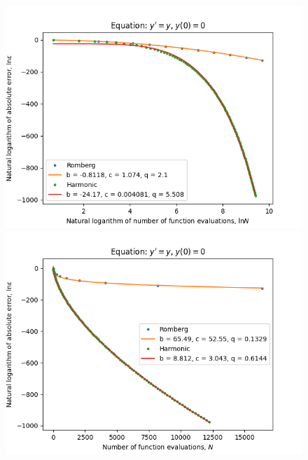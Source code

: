\begin{figure}[H]
\centering
\begin{minipage}{0.45\textwidth}
\centering
\includegraphics[scale=0.45]{emr_plots/exp_growth_hp_log_log_pow_fit_trend.png}
\end{minipage}
\begin{minipage}{0.45\textwidth}
\centering
\includegraphics[scale=0.45]{emr_plots/exp_growth_hp_trend.png}
\end{minipage}
\end{figure}


